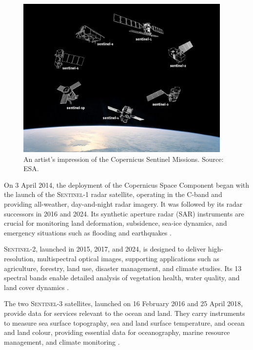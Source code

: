 \begin{figure}[h!]
  \centering
  \includegraphics[width=0.95\textwidth]{img/sentinels.png}
  \caption[Copernicus Sentinel missions (artist’s impression)]{An artist's impression of the Copernicus Sentinel Missions. Source: ESA.}
  \label{fig:sentinels}
\end{figure}

On 3 April 2014, the deployment of the Copernicus Space Component began with the
launch of the \textsc{Sentinel-1} radar satellite, operating in the C-band and providing all-weather, day-and-night radar imagery. It was followed by its radar successors in 2016 and 2024. Its synthetic aperture radar (SAR) instruments are crucial for monitoring land deformation, subsidence, sea-ice dynamics, and emergency situations such as flooding and earthquakes \cite{ESA_Copernicus,ESA_SentinelMissions}.

\textsc{Sentinel-2}, launched in 2015, 2017, and 2024, is designed to deliver high-resolution, multispectral optical images, supporting applications such as agriculture, forestry, land use, disaster management, and climate studies. Its 13 spectral bands enable detailed analysis of vegetation health, water quality, and land cover dynamics \cite{ESA_Copernicus}.

The two \textsc{Sentinel-3} satellites, launched on 16 February 2016 and 25 April 2018, provide data for services relevant to the ocean and land. They carry instruments to measure sea surface topography, sea and land surface temperature, and ocean and land colour, providing essential data for oceanography, marine resource management, and climate monitoring \cite{ESA_SentinelMissions,ESA_Copernicus}.

